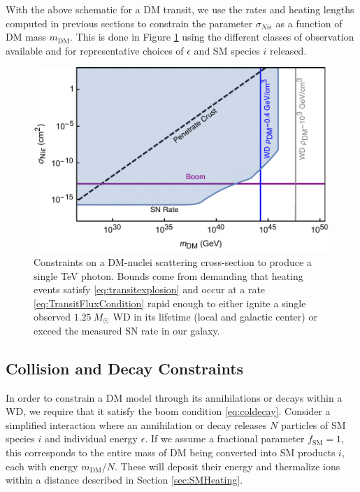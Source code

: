 \documentclass[twocolumn, preprintnumbers,amsmath,amssymb,prd, superscriptaddress]{revtex4}
\begin{document}
With the above schematic for a DM transit, we use the rates and heating lengths computed in previous sections to constrain the parameter $\sigma_{Ni\epsilon}$ as a function of DM mass $m_\text{DM}$.
This is done in Figure \ref{fig:transitclasses} using the different classes of observation available and for representative choices of $\epsilon$ and SM species $i$ released.

\begin{figure}
\includegraphics[scale=.45]{transitobservation.pdf}
\caption{Constraints on a DM-nuclei scattering cross-section to produce a single TeV photon. Bounds come from demanding that heating events satisfy \eqref{eq:transitexplosion} and occur at a rate \eqref{eq:TransitFluxCondition} rapid enough to either ignite a single observed $1.25~M_{\astrosun}$ WD in its lifetime (local and galactic center) or exceed the measured SN rate in our galaxy.}
\label{fig:transitclasses}
\end{figure}

\subsection{Collision and Decay Constraints}
\label{sec:CollisionConstraints}

In order to constrain a DM model through its annihilations or decays within a WD, we require that it satisfy the boom condition \eqref{eq:coldecay}.
Consider a simplified interaction where an annihilation or decay releases $N$ particles of SM species $i$ and individual energy $\epsilon$.
If we assume a fractional parameter $f_\text{SM}=1$, this corresponds to the entire mass of DM being converted into SM products $i$, each with energy $m_\text{DM}/N$.
These will deposit their energy and thermalize ions within a distance described in Section \ref{sec:SMHeating}.
\end{document}
